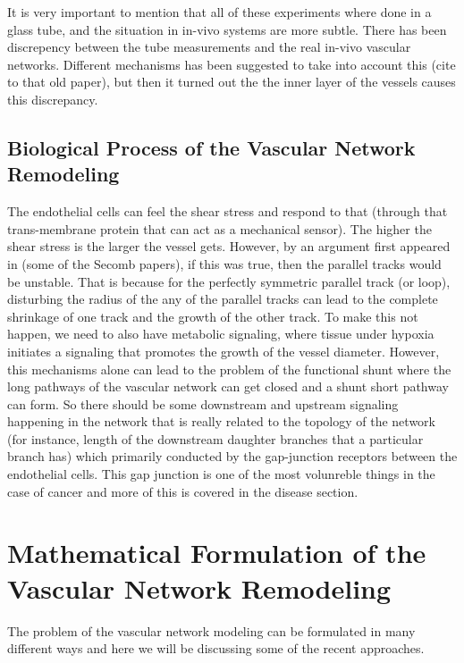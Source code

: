 \documentclass[10pt,a4paper,twocolumn]{article}
\begin{document}
	 It is very important to mention that all of these experiments where done in a glass tube, and the situation in in-vivo systems are more subtle. There has been discrepency between the tube measurements and the real in-vivo vascular networks. Different mechanisms has been suggested to take into account this (cite to that old paper), but then it turned out the the inner layer of the vessels causes this discrepancy.
	
	\subsection{Biological Process of the Vascular Network Remodeling}
	The endothelial cells can feel the shear stress and respond to that (through that trans-membrane protein that can act as a mechanical sensor). The higher the shear stress is the larger the vessel gets. However, by an argument first appeared in (some of the Secomb papers), if this was true, then the parallel tracks would be unstable. That is because for the perfectly symmetric parallel track (or loop), disturbing the radius of the any of the parallel tracks can lead to the complete shrinkage of one track and the growth of the other track. To make this not happen, we need to also have metabolic signaling, where tissue under hypoxia initiates a signaling that promotes the growth of the vessel diameter. However, this mechanisms alone can lead to the problem of the functional shunt where the long pathways of the vascular network can get closed and a shunt short pathway can form. So there should be some downstream and upstream signaling happening in the network that is really related to the topology of the network (for instance, length of the downstream daughter branches that a particular branch has) which primarily conducted by the gap-junction receptors between the endothelial cells. This gap junction is one of the most volunreble things in the case of cancer and more of this is covered in the disease section.
	
	
	\section{Mathematical Formulation of the Vascular Network Remodeling}
	The problem of the vascular network modeling can be formulated in many different ways and here we will be discussing some of the recent approaches. 
	
\end{document}
